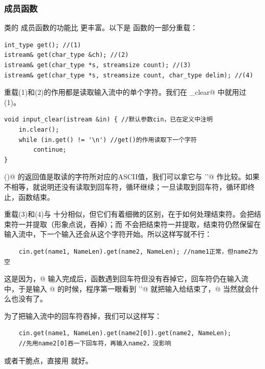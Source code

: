 \subsubsection*{\lstinline@get@ 成员函数}
\lstinline@istream@ 类的 \lstinline@get@ 成员函数的功能比 \lstinline@getline@ 更丰富。以下是 \lstinline@get@ 函数的一部分重载：
\begin{lstlisting}
int_type get(); //(1)
istream& get(char_type &ch); //(2)
istream& get(char_type *s, streamsize count); //(3)
istream& get(char_type *s, streamsize count, char_type delim); //(4)
\end{lstlisting}
重载(1)和(2)的作用都是读取输入流中的单个字符。我们在 \lstinline@input_clear@ 中就用过(1)。
\begin{lstlisting}
void input_clear(istream &in) { //默认参数cin，已在定义中注明
    in.clear();
    while (in.get() != '\n') //get()的作用读取下一个字符
        continue;
}
\end{lstlisting}
\lstinline@get()@ 的返回值是取读的字符所对应的ASCII值，我们可以拿它与 \lstinline@'\n'@ 作比较。如果不相等，就说明还没有读取到回车符，循环继续；一旦读取到回车符，\lstinline@while@ 循环即终止，函数结束。\par
重载(3)和(4)与 \lstinline@getline@ 十分相似，但它们有着细微的区别，在于如何处理结束符。\lstinline@getline@ 会把结束符一并提取（形象点说，吞掉）；而 \lstinline@get@ 不会把结束符一并提取，结束符仍然保留在输入流中，下一个输入还会从这个字符开始。所以这样写就不行：
\begin{lstlisting}
    cin.get(name1, NameLen).get(name2, NameLen); //name1正常，但name2为空
\end{lstlisting}
这是因为，@ 输入完成后，\lstinline@get@ 函数遇到回车符但没有吞掉它，回车符仍在输入流中，于是输入 @ 的时候，程序第一眼看到 \lstinline@'\n'@ 就把输入给结束了，@ 当然就会什么也没有了。\par
为了把输入流中的回车符吞掉，我们可以这样写：
\begin{lstlisting}
    cin.get(name1, NameLen).get(name2[0]).get(name2, NameLen);
    //先用name2[0]吞一下回车符，再输入name2，没影响
\end{lstlisting}\par
或者干脆点，直接用 \lstinline@getline@ 就好。\par
